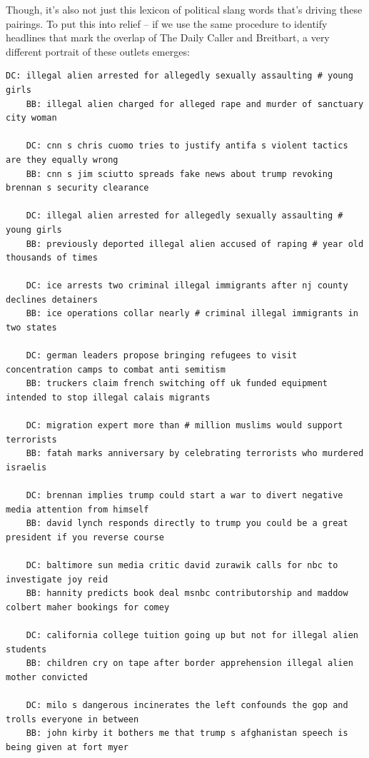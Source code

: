 \documentclass{scrartcl}
\begin{document}
Though, it's also not just this lexicon of political slang words that's driving these pairings. To put this into relief -- if we use the same procedure to identify headlines that mark the overlap of The Daily Caller and Breitbart, a very different portrait of these outlets emerges:

\begin{lstlisting}[basicstyle=\tiny\hlfont]
    DC: illegal alien arrested for allegedly sexually assaulting # young girls
    BB: illegal alien charged for alleged rape and murder of sanctuary city woman

    DC: cnn s chris cuomo tries to justify antifa s violent tactics are they equally wrong
    BB: cnn s jim sciutto spreads fake news about trump revoking brennan s security clearance

    DC: illegal alien arrested for allegedly sexually assaulting # young girls
    BB: previously deported illegal alien accused of raping # year old thousands of times

    DC: ice arrests two criminal illegal immigrants after nj county declines detainers
    BB: ice operations collar nearly # criminal illegal immigrants in two states

    DC: german leaders propose bringing refugees to visit concentration camps to combat anti semitism
    BB: truckers claim french switching off uk funded equipment intended to stop illegal calais migrants

    DC: migration expert more than # million muslims would support terrorists
    BB: fatah marks anniversary by celebrating terrorists who murdered israelis

    DC: brennan implies trump could start a war to divert negative media attention from himself
    BB: david lynch responds directly to trump you could be a great president if you reverse course

    DC: baltimore sun media critic david zurawik calls for nbc to investigate joy reid
    BB: hannity predicts book deal msnbc contributorship and maddow colbert maher bookings for comey

    DC: california college tuition going up but not for illegal alien students
    BB: children cry on tape after border apprehension illegal alien mother convicted

    DC: milo s dangerous incinerates the left confounds the gop and trolls everyone in between
    BB: john kirby it bothers me that trump s afghanistan speech is being given at fort myer


\end{lstlisting}
\end{document}
